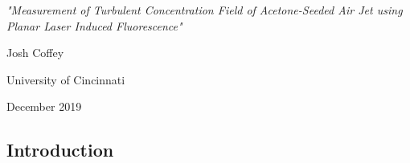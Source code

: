 \documentclass[preview,12pt]{article}
\begin{document}
\begin{titlepage}
    \vspace*{\fill}
    \begin{center}
        \LARGE \textit{"Measurement of Turbulent Concentration Field of Acetone-Seeded Air Jet using Planar Laser Induced Fluorescence"}
    \end{center}
    \begin{center}
       \large Josh Coffey
    \end{center}
    \begin{center}
        \large University of Cincinnati
    \end{center}
    \begin{center}
        \large December 2019
    \end{center}
        \vspace*{\fill}
\end{titlepage}

\begin{center}
    \section*{Introduction}
\end{center}
\end{document}
